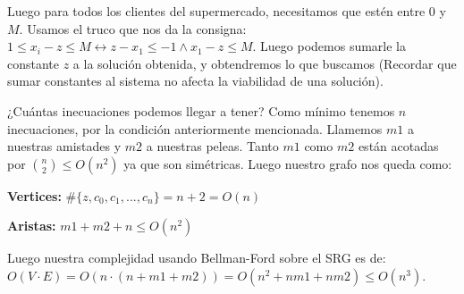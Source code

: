 \documentclass{article}
\begin{document}
Luego para todos los clientes del supermercado, necesitamos que estén entre 0 y $M$. Usamos el truco que nos da la consigna: $1 \leq x_i - z \leq M \leftrightarrow z - x_1 \leq -1 \land x_1 - z \leq M$. Luego podemos sumarle la constante $z$ a la solución obtenida, y obtendremos lo que buscamos (Recordar que sumar constantes al sistema no afecta la viabilidad de una solución).

¿Cuántas inecuaciones podemos llegar a tener? Como mínimo tenemos $n$ inecuaciones, por la condición anteriormente mencionada. Llamemos $m1$  a nuestras amistades y $m2$ a nuestras peleas. Tanto $m1$ como $m2$ están acotadas por ${n \choose 2} \le O(n^{2}) $ ya que son simétricas. Luego nuestro grafo nos queda como:

\textbf{Vertices:} $\# \{z,c_0,c_1,... , c_n \} = n + 2 = O(n)$

\textbf{Aristas:} $m1 + m2 + n \leq O(n^{2})$

Luego nuestra complejidad usando Bellman-Ford sobre el SRG es de: $O(V \cdot E) = O(n \cdot (n + m1 + m2)) = O(n^2 + nm1 + nm2) \leq O(n^{3})$.
\end{document}
